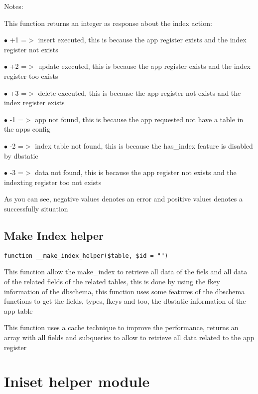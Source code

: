 \documentclass[a4paper]{book}
\begin{document}
Notes:

This function returns an integer as response about the index action:

\begin{compactitem}
\item[\color{myblue}$\bullet$] +1 =$>$ insert executed, this is because the app register exists and the index register not exists
\item[\color{myblue}$\bullet$] +2 =$>$ update executed, this is because the app register exists and the index register too exists
\item[\color{myblue}$\bullet$] +3 =$>$ delete executed, this is because the app register not exists and the index register exists
\item[\color{myblue}$\bullet$] -1 =$>$ app not found, this is because the app requested not have a table in the apps config
\item[\color{myblue}$\bullet$] -2 =$>$ index table not found, this is because the has\_index feature is disabled by dbstatic
\item[\color{myblue}$\bullet$] -3 =$>$ data not found, this is because the app register not exists and the indexting register too not exists
\end{compactitem}

As you can see, negative values denotes an error and positive values denotes a successfully situation

\hypertarget{toc189}{}
\subsection{Make Index helper}

\begin{lstlisting}
function __make_index_helper($table, $id = "")
\end{lstlisting}

This function allow the make\_index to retrieve all data of the fiels
and all data of the related fields of the related tables, this is done
by using the fkey information of the dbschema, this function uses some
features of the dbschema functions to get the fields, types, fkeys and
too, the dbstatic information of the app table

This function uses a cache technique to improve the performance, returns
an array with all fields and subqueries to allow to retrieve all data
related to the app register

\hypertarget{toc190}{}
\section{Iniset helper module}
\end{document}
